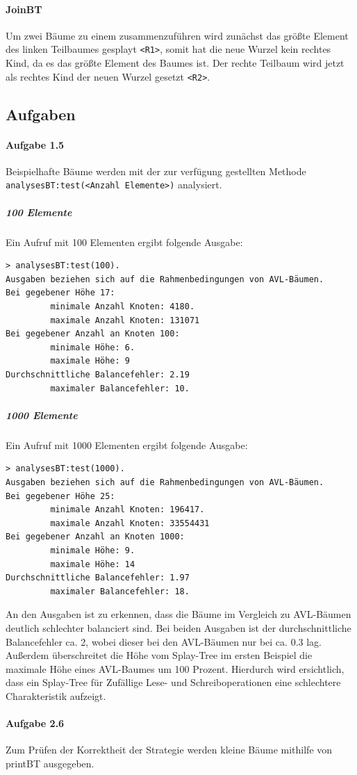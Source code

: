 \paragraph{JoinBT}\label{par:joinbt}
Um zwei Bäume zu einem zusammenzuführen wird zunächst das größte Element des linken Teilbaumes
gesplayt \verb|<R1>|, somit hat die neue Wurzel kein rechtes Kind, da es das größte Element des
Baumes ist.
Der rechte Teilbaum wird jetzt als rechtes Kind der neuen Wurzel gesetzt \verb|<R2>|.

\subsection{Aufgaben}\label{subsec:aufgaben2}

\paragraph{Aufgabe 1.5}
Beispielhafte Bäume werden mit der zur verfügung gestellten Methode\\
\verb|analysesBT:test(<Anzahl Elemente>)| analysiert.

\subparagraph{100 Elemente}
Ein Aufruf mit 100 Elementen ergibt folgende Ausgabe:
\begin{verbatim}
> analysesBT:test(100).
Ausgaben beziehen sich auf die Rahmenbedingungen von AVL-Bäumen.
Bei gegebener Höhe 17:
         minimale Anzahl Knoten: 4180.
         maximale Anzahl Knoten: 131071
Bei gegebener Anzahl an Knoten 100:
         minimale Höhe: 6.
         maximale Höhe: 9
Durchschnittliche Balancefehler: 2.19
         maximaler Balancefehler: 10.
\end{verbatim}

\subparagraph{1000 Elemente}
Ein Aufruf mit 1000 Elementen ergibt folgende Ausgabe:
\begin{verbatim}
> analysesBT:test(1000).
Ausgaben beziehen sich auf die Rahmenbedingungen von AVL-Bäumen.
Bei gegebener Höhe 25:
         minimale Anzahl Knoten: 196417.
         maximale Anzahl Knoten: 33554431
Bei gegebener Anzahl an Knoten 1000:
         minimale Höhe: 9.
         maximale Höhe: 14
Durchschnittliche Balancefehler: 1.97
         maximaler Balancefehler: 18.
\end{verbatim}

An den Ausgaben ist zu erkennen, dass die Bäume im Vergleich zu AVL-Bäumen deutlich schlechter
balanciert sind.
Bei beiden Ausgaben ist der durchschnittliche Balancefehler ca. 2, wobei dieser bei den
AVL-Bäumen nur bei ca. 0.3 lag.
Außerdem überschreitet die Höhe vom Splay-Tree im ersten Beispiel die maximale Höhe eines AVL-Baumes
um 100 Prozent.
Hierdurch wird ersichtlich, dass ein Splay-Tree für Zufällige Lese- und Schreiboperationen eine
schlechtere Charakteristik aufzeigt.

\paragraph{Aufgabe 2.6} Zum Prüfen der Korrektheit der Strategie werden kleine Bäume mithilfe von
printBT ausgegeben.
